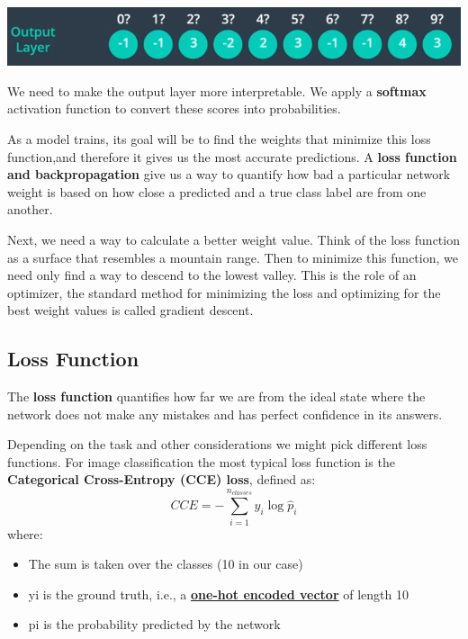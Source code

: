 \includegraphics[width=1\linewidth]{img//cnn/image5.png}

We need to make the output layer more interpretable. We apply a \textbf{softmax} activation function to convert these scores into probabilities. \newline

As a model trains, its goal will be to find the weights that minimize this loss function,and therefore it gives us the most accurate predictions. A \textbf{loss function and backpropagation} give us a way to quantify how bad a particular network weight is based on how close a predicted and a true class label are from one another. \newline

Next, we need a way to calculate a better weight value. Think of the loss function as a surface that resembles a mountain range. Then to minimize this function, we need only find a way to descend to the lowest valley. This is the role of an optimizer, the standard method for minimizing the loss and optimizing for the best weight values is called gradient descent. \newline

\subsection{Loss Function}

The \textbf{loss function} quantifies how far we are from the ideal state where the network does not make any mistakes and has perfect confidence in its answers.

Depending on the task and other considerations we might pick different loss functions. For image classification the most typical loss function is the \textbf{Categorical Cross-Entropy (CCE) loss}, defined as: \[CCE = -\sum_{i=1}^{n_{classes}} y_i \log \hat{p}_i\]
where:

\begin{itemize}
    \item The sum is taken over the classes (10 in our case)
    \item yi is the ground truth, i.e., a \href{https://en.wikipedia.org/wiki/One-hot\#Machine_learning_and_statistics}{\textbf{one-hot encoded vector}} of length 10
    \item pi is the probability predicted by the network
\end{itemize}

